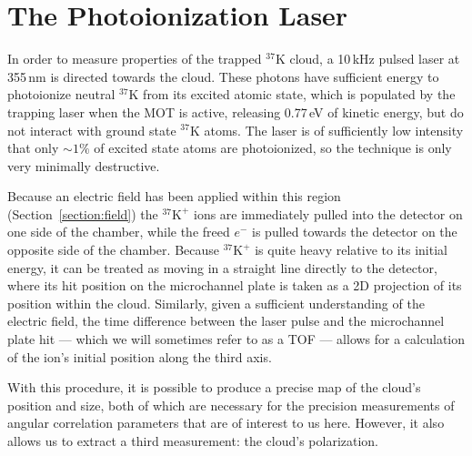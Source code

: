 \section{The Photoionization Laser}
\label{cloud}
\label{photoions}
In order to measure properties of the trapped $^{37}\textrm{K}$ cloud, a 10\,kHz pulsed laser at 355\,nm is directed towards the cloud.  These photons have sufficient energy to photoionize neutral $^{37}\textrm{K}$ from its excited atomic state, which is populated by the trapping laser when the MOT is active, releasing 0.77\,eV of kinetic energy, but do not interact with ground state $^{37}\textrm{K}$ atoms.  The laser is of sufficiently low intensity that only $\sim 1\%$ of excited state atoms are photoionized, so the technique is only very minimally destructive.

Because an electric field has been applied within this region (Section~\ref{section:field})
the $^{37}\textrm{K}^+$ ions are immediately pulled into the detector on one side of the chamber, while the freed $e^-$ is pulled towards the detector on the opposite side of the chamber.  Because  $^{37}\textrm{K}^+$ is quite heavy relative to its initial energy, it can be treated as moving in a straight line directly to the detector, where its hit position on the microchannel plate is taken as a 2D projection of its position within the cloud.  Similarly, given a sufficient understanding of the electric field, the time difference between the laser pulse and the microchannel plate hit --- which we will sometimes refer to as a \ac{TOF} --- allows for a calculation of the ion's initial position along the third axis.  



With this procedure, it is possible to produce a precise map of the cloud's position and size, both of which are necessary for the precision measurements of angular correlation parameters that are of interest to us here.  However, it also allows us to extract a third measurement:  the cloud's polarization.

